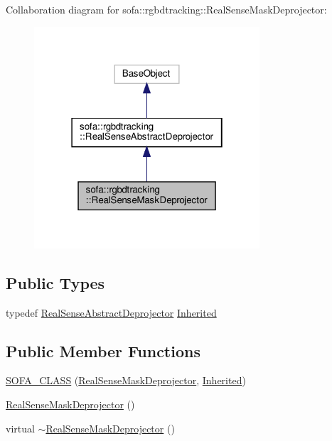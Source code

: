 Collaboration diagram for sofa\+:\+:rgbdtracking\+:\+:Real\+Sense\+Mask\+Deprojector\+:\nopagebreak
\begin{figure}[H]
\begin{center}
\leavevmode
\includegraphics[width=238pt]{classsofa_1_1rgbdtracking_1_1_real_sense_mask_deprojector__coll__graph}
\end{center}
\end{figure}
\subsection*{Public Types}
\begin{DoxyCompactItemize}
\item 
typedef \hyperlink{classsofa_1_1rgbdtracking_1_1_real_sense_abstract_deprojector}{Real\+Sense\+Abstract\+Deprojector} \hyperlink{classsofa_1_1rgbdtracking_1_1_real_sense_mask_deprojector_aa8f05cf5049f6cef0ea54ba40efa0727}{Inherited}
\end{DoxyCompactItemize}
\subsection*{Public Member Functions}
\begin{DoxyCompactItemize}
\item 
\hyperlink{classsofa_1_1rgbdtracking_1_1_real_sense_mask_deprojector_a7661938009502eb3591b1cf196b3489d}{S\+O\+F\+A\+\_\+\+C\+L\+A\+SS} (\hyperlink{classsofa_1_1rgbdtracking_1_1_real_sense_mask_deprojector}{Real\+Sense\+Mask\+Deprojector}, \hyperlink{classsofa_1_1rgbdtracking_1_1_real_sense_abstract_deprojector_a9b4cae154f99cca58b05da9c4b0084ab}{Inherited})
\item 
\hyperlink{classsofa_1_1rgbdtracking_1_1_real_sense_mask_deprojector_a3556cd8c9ce3603055f492cbcd415ba9}{Real\+Sense\+Mask\+Deprojector} ()
\item 
virtual \hyperlink{classsofa_1_1rgbdtracking_1_1_real_sense_mask_deprojector_a18d907fc78f430b1e083e65b15308f53}{$\sim$\+Real\+Sense\+Mask\+Deprojector} ()
\end{DoxyCompactItemize}

